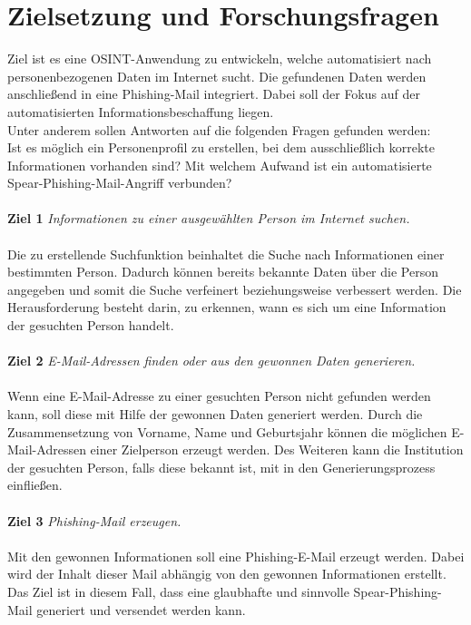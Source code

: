 \section{Zielsetzung und Forschungsfragen}
\label {sec:Zielsetzung}
Ziel ist es eine OSINT-Anwendung zu entwickeln, welche automatisiert nach personenbezogenen Daten im Internet sucht. Die gefundenen Daten werden anschließend in eine Phishing-Mail integriert. Dabei soll der Fokus auf der automatisierten Informationsbeschaffung liegen.\\ 
Unter anderem sollen Antworten auf die folgenden Fragen gefunden werden:\\ Ist es möglich ein Personenprofil zu erstellen, bei dem ausschließlich korrekte Informationen vorhanden sind? Mit welchem Aufwand ist ein automatisierte Spear-Phishing-Mail-Angriff verbunden?
 \\\\
 {\bf Ziel 1} \textit{Informationen zu einer ausgewählten Person im Internet suchen.}\\\\
 Die zu erstellende Suchfunktion beinhaltet die Suche nach Informationen einer bestimmten Person. Dadurch können bereits bekannte Daten über die Person angegeben und somit die Suche verfeinert beziehungsweise verbessert werden. Die Herausforderung besteht darin, zu erkennen, wann es sich um eine Information der gesuchten Person handelt.\\\\
 {\bf Ziel 2} \textit{E-Mail-Adressen finden oder aus den gewonnen Daten generieren.}\\\\
 Wenn eine E-Mail-Adresse zu einer gesuchten Person nicht gefunden werden kann, soll diese mit Hilfe der gewonnen Daten generiert werden. Durch die Zusammensetzung von Vorname, Name und Geburtsjahr können die möglichen E-Mail-Adressen einer Zielperson erzeugt werden. Des Weiteren kann die Institution der gesuchten Person, falls diese bekannt ist, mit in den Generierungsprozess einfließen.\\\\
 {\bf Ziel 3} \textit{Phishing-Mail erzeugen.}\\\\
 Mit den gewonnen Informationen soll eine Phishing-E-Mail erzeugt werden. Dabei wird der Inhalt dieser Mail abhängig von den gewonnen Informationen erstellt. Das Ziel ist in diesem Fall, dass eine glaubhafte und sinnvolle Spear-Phishing-Mail generiert und versendet werden kann.
 

